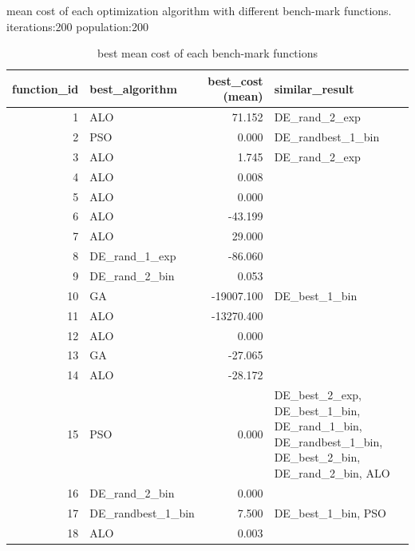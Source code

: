\documentclass[12pt]{article}
\begin{document}
\begin{table}[H]
\begin{adjustbox}{width=1\textwidth}
        
    \end{adjustbox}
    \caption{mean cost of each optimization algorithm with different bench-mark functions. iterations:200 population:200} 
    \label{tab:summary}
\end{table}



\begin{table}[H]
    \centering
    \scriptsize

\begin{tabular}{rlrp{}}
    \toprule
    function\_id &     best\_algorithm &  best\_cost (mean) &                                                                                     similar\_result \\
    \midrule
    1 &  ALO & 71.152 &  DE\_rand\_2\_exp \\
    2 &  PSO & 0.000 &  DE\_randbest\_1\_bin \\
    3 &  ALO & 1.745 &  DE\_rand\_2\_exp \\
    4 &  ALO & 0.008 &   \\
    5 &  ALO & 0.000 &   \\
    6 &  ALO & -43.199 &   \\
    7 &  ALO & 29.000 &   \\
    8 &  DE\_rand\_1\_exp & -86.060 &   \\
    9 &  DE\_rand\_2\_bin & 0.053 &   \\
    10 &  GA & -19007.100 &  DE\_best\_1\_bin \\
    11 &  ALO & -13270.400 &   \\
    12 &  ALO & 0.000 &   \\
    13 &  GA & -27.065 &   \\
    14 &  ALO & -28.172 &   \\
    15 &  PSO & 0.000 &  DE\_best\_2\_exp, DE\_best\_1\_bin, DE\_rand\_1\_bin, DE\_randbest\_1\_bin, DE\_best\_2\_bin, DE\_rand\_2\_bin, ALO \\
    16 &  DE\_rand\_2\_bin & 0.000 &   \\
    17 &  DE\_randbest\_1\_bin & 7.500 &  DE\_best\_1\_bin, PSO \\
    18 &  ALO & 0.003 &   \\
    \bottomrule
\end{tabular}


    \caption{best mean cost of each bench-mark functions} 
    \label{tab:summary_best}
\end{table}
\end{document}
